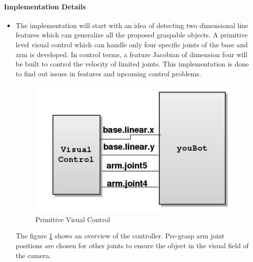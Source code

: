 \paragraph{Implementation Details}
 \begin{itemize}
\item The implementation will start with an idea of detecting two dimensional line features which can generalize all the proposed graspable objects. A primitive level visual control which can handle only four specific joints of the base and arm is developed. In control terms, a feature Jacobian of dimension four will be built to 
control the velocity of limited joints. This implementation is done to find out issues in features and upcoming control problems.
\begin{figure}[here]
 \vspace{2 mm}
  \centerline {\includegraphics[scale=0.44]{images/vs_primitive}}
  \caption{Primitive Visual Control}
 \vspace{2 mm}
\label{fig:primviscont}
\end{figure}
\newline
The figure \ref{fig:primviscont} shows an overview of the controller. Pre-grasp arm joint positions are chosen for other joints to ensure the object in the visual field 
of the camera.


\end{itemize}
